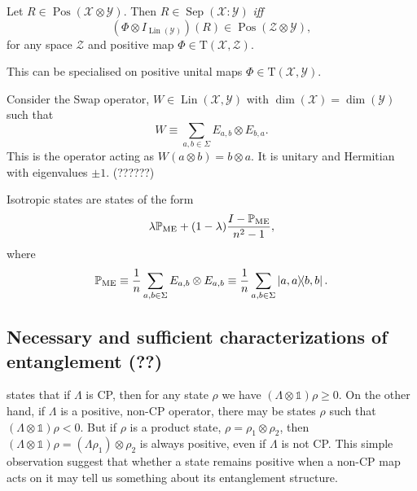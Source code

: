 \documentclass[12pt]{report}
\newcommand{\PP}{\mathbb{P}}
\newcommand{\on}[1]{\operatorname{#1}}
\newcommand{\calY}{{\mathcal{Y}}}
\newcommand{\calX}{{\mathcal{X}}}
\newcommand{\calZ}{{\mathcal{Z}}}
\newcommand{\rmT}{{\mathrm{T}}}
\DeclareMathOperator{\Pos}{Pos}
\DeclareMathOperator{\Lin}{Lin}
\begin{document}
\begin{prop}
	Let $R\in\Pos(\calX\otimes\calY)$. Then
	$R\in\on{Sep}(\calX:\calY)$ \emph{iff}
	\begin{equation}
		(\Phi\otimes I_{\Lin(\calY)})(R) \in \Pos(\calZ\otimes\calY),
	\end{equation}
	for any space $\calZ$ and positive map $\Phi\in\rmT(\calX,\calZ)$.
\end{prop}

This can be specialised on positive unital maps $\Phi\in\rmT(\calX,\calY)$. 

\begin{example}
	Consider the Swap operator, $W\in\Lin(\calX,\calY)$ with $\dim(\calX)=\dim(\calY)$ such that
	\begin{equation}
		W \equiv \sum_{a,b\in\Sigma} E_{a,b} \otimes E_{b,a}.
	\end{equation}
	This is the operator acting as $W(a\otimes b)=b\otimes a$.
	It is unitary and Hermitian with eigenvalues $\pm1$.
	(??????)
\end{example}

\begin{example}
	Isotropic states are states of the form
	\begin{equation}
		\lambda \PP_{\rm ME} + (1-\lambda) \frac{I - \PP_{\rm ME}}{n^2-1},
	\end{equation}
	where
	\begin{equation}
		\PP_{\rm ME} \equiv \frac{1}{n} \sum_{a,b\in\Sigma} E_{a,b} \otimes E_{a,b}
		\equiv \frac{1}{n} \sum_{a,b\in\Sigma} \ketbra{a,a}{b,b}.
	\end{equation}
\end{example}


\subsection{Necessary and sufficient characterizations of entanglement (??)}
 states that if $\Lambda$ is \ac{CP},
then for any state $\rho$ we have $(\Lambda \otimes \mathds1)\rho \ge 0$.
On the other hand, if $\Lambda$ is a positive, non-\ac{CP} operator, there may be states $\rho$ such that
$(\Lambda \otimes \mathds1)\rho < 0$.
But if $\rho$ is a product state, $\rho = \rho_1 \otimes \rho_2$, then
$(\Lambda \otimes \mathds1)\rho = (\Lambda \rho_1) \otimes \rho_2$ is always positive,
even if $\Lambda$ is not \ac{CP}.
This simple observation suggest that whether a state remains positive when a non-\ac{CP} map acts on it may tell us something about its entanglement structure.
\end{document}
